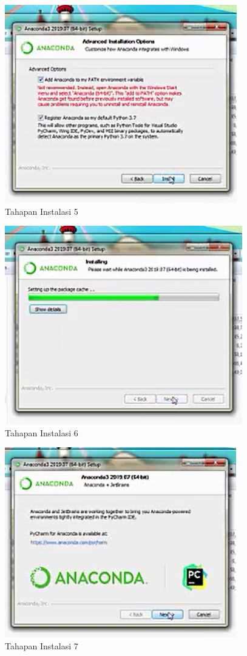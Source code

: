 	\begin{figure}
	\includegraphics[scale=0.5]{section/5.png}
	\centering
	\caption{Tahapan Instalasi 5}
	\end{figure}

	\begin{figure}
	\includegraphics[scale=0.5]{section/6.png}
	\centering
	\caption{Tahapan Instalasi 6}
	\end{figure}

	\begin{figure}
	\includegraphics[scale=0.5]{section/7.png}
	\centering
	\caption{Tahapan Instalasi 7}
	\end{figure}


